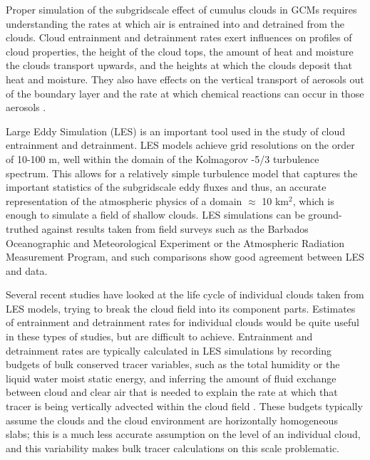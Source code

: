 \documentclass[12pt]{article}
\begin{document}
Proper simulation of the subgridscale effect of cumulus clouds in GCMs requires 
understanding the rates at which air is entrained into and detrained from the 
clouds. Cloud entrainment and detrainment rates exert influences on profiles of 
cloud properties, the height of the cloud tops, the amount of heat and moisture 
the clouds transport upwards, and the heights at which the clouds deposit that 
heat and moisture.  They also have effects on the vertical transport of 
aerosols out of the boundary layer and the rate at which chemical reactions can 
occur in those aerosols \citep{Barahona2007,Anldrejczuk2008}.

Large Eddy Simulation (LES) is an important tool used in the study of cloud 
entrainment and detrainment. LES models achieve grid resolutions on the order 
of 10-100 m, well within the domain of the Kolmagorov -5/3 turbulence spectrum. 
This allows for a relatively simple turbulence model that captures the 
important statistics of the subgridscale eddy fluxes and thus, an accurate 
representation of the atmospheric physics of a domain $\approx$ 10 km$^{2}$, 
which is enough to simulate a field of shallow clouds. LES simulations can be 
ground-truthed against results taken from field surveys such as the Barbados 
Oceanographic and Meteorological Experiment \citep[BOMEX;][]{Holland1973} or 
the Atmospheric Radiation Measurement \citep[ARM;][]{Brown2002} Program, and 
such comparisons show good agreement between LES and data.

Several recent studies have looked at the life cycle of individual clouds taken 
from LES models, trying to break the cloud field into its component parts. 
Estimates of entrainment and detrainment rates for individual clouds would be 
quite useful in these types of studies, but are difficult to achieve. 
Entrainment and detrainment rates are typically calculated in LES simulations 
by recording budgets of bulk conserved tracer variables, such as the total 
humidity or the liquid water moist static energy, and inferring the amount of
fluid exchange between cloud and clear air that is needed to explain the rate 
at which that tracer is being vertically advected within the cloud field 
\citep{Cuijpers1995}. These budgets typically assume the clouds and the cloud 
environment are horizontally homogeneous slabs; this is a much less accurate 
assumption on the level of an individual cloud, and this variability makes 
bulk tracer calculations on this scale problematic.
\end{document}
